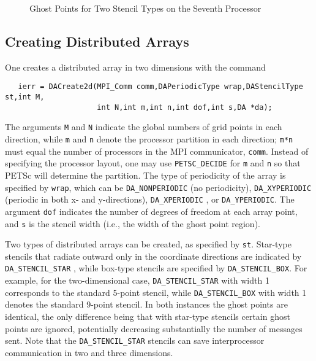 \begin{figure}[tb]
\centerline{}
\caption{Ghost Points for Two Stencil Types on the Seventh Processor}
\label{fig:ghosts}
\end{figure}

\subsection{Creating Distributed Arrays}

One creates a distributed array in two dimensions with the command 
\begin{verbatim}
   ierr = DACreate2d(MPI_Comm comm,DAPeriodicType wrap,DAStencilType st,int M,
                     int N,int m,int n,int dof,int s,DA *da);
\end{verbatim}
The   arguments
 {\tt M} and {\tt N} indicate the global
numbers of grid points in each direction, while {\tt m} and {\tt n}
denote the processor partition in each direction; {\tt m*n} must equal
the number of processors in the MPI communicator, {\tt comm}.  
Instead of specifying the processor layout, one may use
{\tt PETSC\_DECIDE} for {\tt m} and {\tt n} 
so that PETSc will determine the partition. The type of
periodicity of the array is specified by {\tt wrap}, which can be 
{\tt DA\_NONPERIODIC}  (no periodicity), 
{\tt DA\_XYPERIODIC}  (periodic in
both x- and y-directions), {\tt DA\_XPERIODIC} , 
or {\tt DA\_YPERIODIC}.  The argument {\tt dof} 
indicates the number of degrees of freedom at each array point,
and {\tt s} is the stencil width (i.e., the width of the ghost point region).

Two types of distributed arrays can be created, as specified by {\tt st}.
Star-type stencils that radiate outward only in the coordinate
directions are indicated by {\tt DA\_STENCIL\_STAR}
, while box-type stencils are specified by
{\tt DA\_STENCIL\_BOX}.  For example, for the
two-dimensional case,
{\tt DA\_STENCIL\_STAR} with width 1 corresponds to the standard 5-point
stencil, while {\tt DA\_STENCIL\_BOX} with width 1 denotes the
standard 9-point stencil.  In both instances the ghost points are
identical, the only difference being that with star-type stencils
certain ghost points are ignored, potentially decreasing substantially
the number of messages sent.  Note that the {\tt DA\_STENCIL\_STAR}
stencils can save interprocessor communication in two and three
dimensions.

